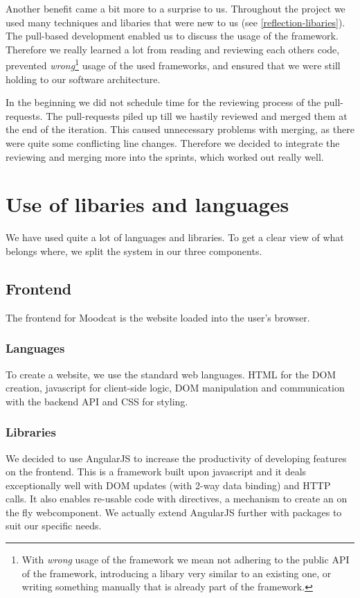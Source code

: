 \par
Another benefit came a bit more to a surprise to us.
Throughout the project we used many techniques and libaries that were new to us (see \ref{reflection-libaries}).
The pull-based development enabled us to discuss the usage of the framework.
Therefore we really learned a lot from reading and reviewing each others code,  prevented \textit{wrong}\footnote{With \textit{wrong} usage of the framework we mean not adhering to the public API of the framework, introducing a libary very similar to an existing one, or writing something manually that is already part of the framework.} usage of the used frameworks, and ensured that we were still holding to our software architecture.

\par
In the beginning we did not schedule time for the reviewing process of the pull-requests.
The pull-requests piled up till we hastily reviewed and merged them at the end of the iteration.
This caused unnecessary problems with merging, as there were quite some conflicting line changes.
Therefore we decided to integrate the reviewing and merging more into the sprints, which worked out really well.

\label{reflection-libaries}
\section{Use of libaries and languages}
We have used quite a lot of languages and libraries.
To get a clear view of what belongs where, we split the system in our three components.

\subsection{Frontend}
The frontend for Moodcat is the website loaded into the user's browser.

\subsubsection{Languages}
To create a website, we use the standard web languages.
HTML for the DOM creation, javascript for client-side logic, DOM manipulation and communication with the backend API and CSS for styling.

\subsubsection{Libraries}
We decided to use AngularJS to increase the productivity of developing features on the frontend.
This is a framework built upon javascript and it deals exceptionally well with DOM updates (with 2-way data binding) and HTTP calls.
It also enables re-usable code with directives, a mechanism to create an on the fly webcomponent.
We actually extend AngularJS further with packages to suit our specific needs.

